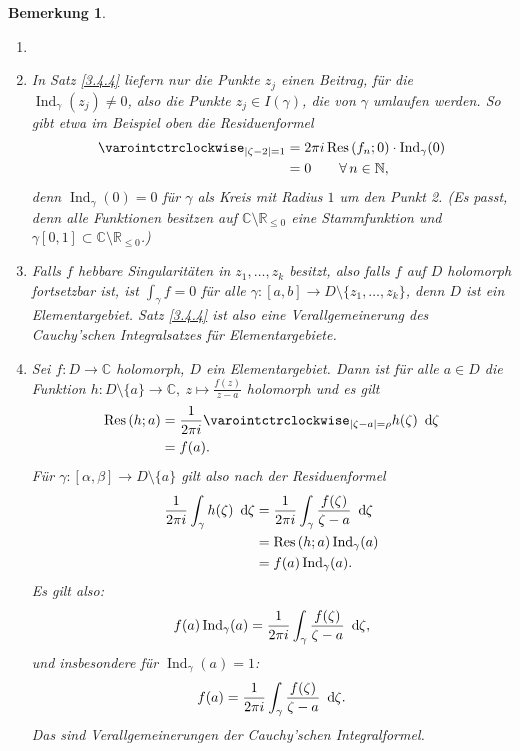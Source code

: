 \documentclass[a4paper,12pt]{book}
\theoremstyle{newthm}
\theoremstyle{newdef}
\theoremstyle{newrem}
\newtheorem*{rem}{Bemerkung}
\newcommand{\N}{\mathbb{N}}
\newcommand{\R}{\mathbb{R}}
\newcommand{\C}{\mathbb{C}}
\renewcommand{\d}{\ \operatorname{d}\hspace{-2px}}
\newcommand{\Ind}[1]{\operatorname{Ind}_{#1}}
\newcommand{\Res}[2]{\operatorname{Res} \left( #1;#2 \right) }
\begin{document}
		\begin{rem}
			\begin{enumerate}[label={\alph*})]
				\item[]
				\item In Satz \ref{3.4.4} liefern nur die Punkte $z_j$ einen Beitrag, für die $\Ind{\gamma}(z_j) \neq 0$, also die Punkte $z_j \in I(\gamma)$, die von $\gamma$ umlaufen werden. So gibt etwa im Beispiel oben die Residuenformel 
				\begin{align*}
					\varointctrclockwise_{|\zeta - 2|=1} &= 2\pi i \Res{f_n}{0} \cdot \Ind{\gamma}(0)\\
					&= 0 \qquad \forall\, n \in \N,
				\end{align*}
				denn $\Ind{\gamma}(0) = 0$ für $\gamma$ als Kreis mit Radius $1$ um den Punkt 2. (Es passt, denn alle Funktionen besitzen auf $\C \setminus\R_{\leq 0}$ eine Stammfunktion und $ \gamma[0,1] \subset \C\setminus\R_{\leq 0} $.)
				\item Falls $f$ hebbare Singularitäten in $z_1,\dotsc,z_k$ besitzt, also falls $f$ auf $D$ holomorph fortsetzbar ist, ist $\int_\gamma f = 0$ für alle $ \gamma:[a,b] \to D \setminus\{z_1,\dotsc,z_k\} $, denn $D$ ist ein Elementargebiet. Satz \ref{3.4.4} ist also eine Verallgemeinerung des Cauchy'schen Integralsatzes für Elementargebiete.
				\item Sei $ f: D \to \C $ holomorph, $D$ ein Elementargebiet. Dann ist für alle $a \in D$ die Funktion $ h: D \setminus\{a\} \to \C,\ z \mapsto \frac{f(z)}{z-a} $ holomorph und es gilt
				\begin{align*}
					\Res{h}{a} &= \frac{1}{2\pi i} \varointctrclockwise_{|\zeta - a| = \rho} h(\zeta)\d\zeta\\
					&= f(a).
				\end{align*}
				Für $ \gamma: [\alpha,\beta] \to D\setminus\{a\} $ gilt also nach der Residuenformel
				\begin{align*}
					\frac{1}{2\pi i} \int_\gamma h(\zeta)\d\zeta &= \frac{1}{2\pi i} \int_\gamma \frac{f(\zeta)}{\zeta-a} \d\zeta\\
					&= \Res{h}{a} \Ind{\gamma}(a)\\
					&= f(a) \Ind{\gamma}(a).
				\end{align*}
				Es gilt also:
				\[ f(a)\Ind{\gamma}(a) = \frac{1}{2\pi i} \int_\gamma \frac{f(\zeta)}{\zeta-a}\d\zeta, \]
				und insbesondere für $\Ind{\gamma}(a) = 1$:
				\[ f(a) = \frac{1}{2\pi i} \int_\gamma \frac{f(\zeta)}{\zeta -a}\d\zeta. \]
				Das sind Verallgemeinerungen der Cauchy'schen Integralformel.
			\end{enumerate}
		\end{rem}
		
\end{document}
